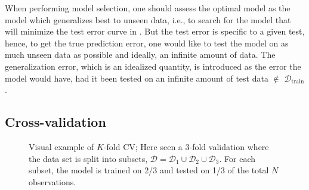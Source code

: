 
When performing model selection, one should assess the optimal model as the model which generalizes best to unseen data, i.e., to search for the model that will minimize the test error curve in . But the test error is specific to a given test, hence, to get the true prediction error, one would like to test the model on as much unseen data as possible and ideally, an infinite amount of data. The generalization error, which is an idealized quantity, is introduced as the error the model would have, had it been tested on an infinite amount of test data $\notin$ $\mathcal{D}_{\mathrm{train}}$.

\subsection{Cross-validation}\label{sec:crossvalidation}

\begin{figure}[ht]
    \centering
    \iffigure
    \fi
    \caption[Cross-validation illustration]{Visual example of $K$-fold CV; Here seen a 3-fold validation where the data set is split into subsets, $\mathcal{D} = \mathcal{D}_1 \cup \mathcal{D}_2 \cup \mathcal{D}_3 $. For each subset, the model is trained on 2/3 and tested on 1/3 of the total $N$ observations.}
    \label{fig:kfold}
\end{figure}


